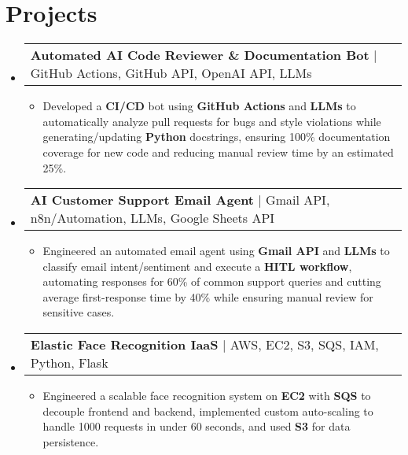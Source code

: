 \documentclass[letterpaper,11pt]{article}
\makeatletter
\newcommand{\resumeItem}[1]{
  \item\footnotesize{
    {#1 \vspace{-2pt}}
  }
}
\newcommand{\resumeProjectHeading}[2]{
    \item
    \begin{tabular*}{1.001\textwidth}{l@{\extracolsep{\fill}}r}
      \small#1 & \textbf{\small #2}\\
    \end{tabular*}\vspace{-7pt}
}
\newcommand{\resumeSubHeadingListStart}{\begin{itemize}[leftmargin=0pt, label={}]}
\newcommand{\resumeSubHeadingListEnd}{\end{itemize}}
\newcommand{\resumeItemListStart}{\begin{itemize}[leftmargin=*]}
\newcommand{\resumeItemListEnd}{\end{itemize}\vspace{-5pt}}
\makeatother
\begin{document}
\section{Projects}
    \vspace{-5pt}
    \resumeSubHeadingListStart
      \resumeProjectHeading
          {\textbf{Automated AI Code Reviewer \& Documentation Bot} $|$ GitHub Actions, GitHub API, OpenAI API, LLMs}{}
          \resumeItemListStart
              \resumeItem{Developed a \textbf{CI/CD} bot using \textbf{GitHub Actions} and \textbf{LLMs} to automatically analyze pull requests for bugs and style violations while generating/updating \textbf{Python} docstrings, ensuring 100\% documentation coverage for new code and reducing manual review time by an estimated 25\%.}
          \resumeItemListEnd
          \vspace{-16pt}
      \resumeProjectHeading
          {\textbf{AI Customer Support Email Agent} $|$ Gmail API, n8n/Automation, LLMs, Google Sheets API}{}
          \resumeItemListStart
              \resumeItem{Engineered an automated email agent using \textbf{Gmail API} and \textbf{LLMs} to classify email intent/sentiment and execute a \textbf{HITL workflow}, automating responses for 60\% of common support queries and cutting average first-response time by 40\% while ensuring manual review for sensitive cases.}
          \resumeItemListEnd
          \vspace{-16pt}
      \resumeProjectHeading
          {\textbf{Elastic Face Recognition IaaS} $|$ AWS, EC2, S3, SQS, IAM, Python, Flask}{}
          \resumeItemListStart
              \resumeItem{Engineered a scalable face recognition system on \textbf{EC2} with \textbf{SQS} to decouple frontend and backend, implemented custom auto-scaling to handle 1000 requests in under 60 seconds, and used \textbf{S3} for data persistence.}
          \resumeItemListEnd 
    \resumeSubHeadingListEnd
\vspace{-10pt}
\end{document}
